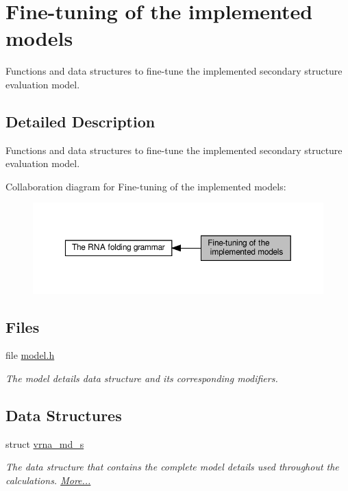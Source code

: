 \hypertarget{group__model__details}{}\section{Fine-\/tuning of the implemented models}
\label{group__model__details}


Functions and data structures to fine-\/tune the implemented secondary structure evaluation model.  




\subsection{Detailed Description}
Functions and data structures to fine-\/tune the implemented secondary structure evaluation model. 

Collaboration diagram for Fine-\/tuning of the implemented models\+:
\nopagebreak
\begin{figure}[H]
\begin{center}
\leavevmode
\includegraphics[width=350pt]{group__model__details}
\end{center}
\end{figure}
\subsection*{Files}
\begin{DoxyCompactItemize}
\item 
file \hyperlink{model_8h}{model.\+h}
\begin{DoxyCompactList}\small\item\em The model details data structure and its corresponding modifiers. \end{DoxyCompactList}\end{DoxyCompactItemize}
\subsection*{Data Structures}
\begin{DoxyCompactItemize}
\item 
struct \hyperlink{group__model__details_structvrna__md__s}{vrna\+\_\+md\+\_\+s}
\begin{DoxyCompactList}\small\item\em The data structure that contains the complete model details used throughout the calculations.  \hyperlink{group__model__details_structvrna__md__s}{More...}\end{DoxyCompactList}\end{DoxyCompactItemize}
